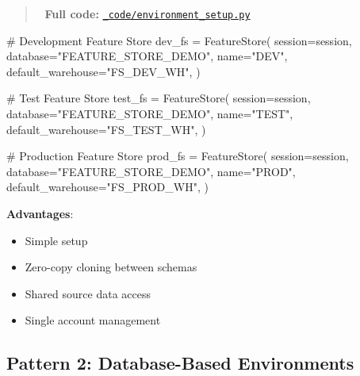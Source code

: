 \documentclass[
  letterpaper,
  DIV=11,
  numbers=noendperiod]{scrreprt}
\newenvironment{Shaded}{\begin{snugshade}}{\end{snugshade}}
\newcommand{\CommentTok}[1]{\textcolor[rgb]{0.37,0.37,0.37}{#1}}
\newcommand{\NormalTok}[1]{\textcolor[rgb]{0.00,0.23,0.31}{#1}}
\newcommand{\OperatorTok}[1]{\textcolor[rgb]{0.37,0.37,0.37}{#1}}
\newcommand{\StringTok}[1]{\textcolor[rgb]{0.13,0.47,0.30}{#1}}
\providecommand{\tightlist}{%
  \setlength{\itemsep}{0pt}\setlength{\parskip}{0pt}}\usepackage{longtable,booktabs,array}
\begin{document}
\begin{quote}
📁 \textbf{Full code:}
\href{_code/environment_setup.py}{\texttt{\_code/environment\_setup.py}}
\end{quote}

\begin{Shaded}
\begin{Highlighting}[]
\CommentTok{\# Development Feature Store}
\NormalTok{dev\_fs }\OperatorTok{=}\NormalTok{ FeatureStore(}
\NormalTok{    session}\OperatorTok{=}\NormalTok{session,}
\NormalTok{    database}\OperatorTok{=}\StringTok{"FEATURE\_STORE\_DEMO"}\NormalTok{,}
\NormalTok{    name}\OperatorTok{=}\StringTok{"DEV"}\NormalTok{,}
\NormalTok{    default\_warehouse}\OperatorTok{=}\StringTok{"FS\_DEV\_WH"}\NormalTok{,}
\NormalTok{)}

\CommentTok{\# Test Feature Store}
\NormalTok{test\_fs }\OperatorTok{=}\NormalTok{ FeatureStore(}
\NormalTok{    session}\OperatorTok{=}\NormalTok{session,}
\NormalTok{    database}\OperatorTok{=}\StringTok{"FEATURE\_STORE\_DEMO"}\NormalTok{,}
\NormalTok{    name}\OperatorTok{=}\StringTok{"TEST"}\NormalTok{,}
\NormalTok{    default\_warehouse}\OperatorTok{=}\StringTok{"FS\_TEST\_WH"}\NormalTok{,}
\NormalTok{)}

\CommentTok{\# Production Feature Store}
\NormalTok{prod\_fs }\OperatorTok{=}\NormalTok{ FeatureStore(}
\NormalTok{    session}\OperatorTok{=}\NormalTok{session,}
\NormalTok{    database}\OperatorTok{=}\StringTok{"FEATURE\_STORE\_DEMO"}\NormalTok{,}
\NormalTok{    name}\OperatorTok{=}\StringTok{"PROD"}\NormalTok{,}
\NormalTok{    default\_warehouse}\OperatorTok{=}\StringTok{"FS\_PROD\_WH"}\NormalTok{,}
\NormalTok{)}
\end{Highlighting}
\end{Shaded}

\textbf{Advantages}:

\begin{itemize}
\tightlist
\item
  Simple setup
\item
  Zero-copy cloning between schemas
\item
  Shared source data access
\item
  Single account management
\end{itemize}

\hypertarget{pattern-2-database-based-environments}{%
\subsection{Pattern 2: Database-Based
Environments}\label{pattern-2-database-based-environments}}
\end{document}
